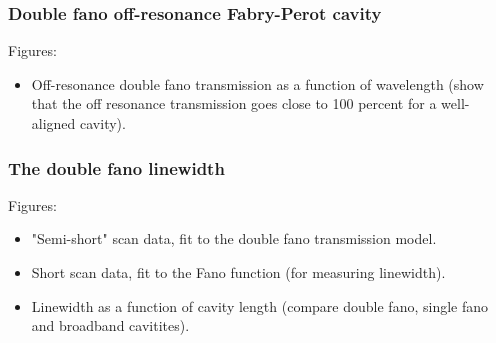 \subsubsection{Double fano off-resonance Fabry-Perot cavity}

Figures:
\begin{itemize}
    \item Off-resonance double fano transmission as a function of wavelength (show that the off resonance transmission goes close to 100 percent for a well-aligned cavity).
\end{itemize}

\subsubsection{The double fano linewidth}

Figures: 
\begin{itemize}
    \item "Semi-short" scan data, fit to the double fano transmission model. 
    \item Short scan data, fit to the Fano function (for measuring linewidth).
    \item Linewidth as a function of cavity length (compare double fano, single fano and broadband cavitites).
\end{itemize}

